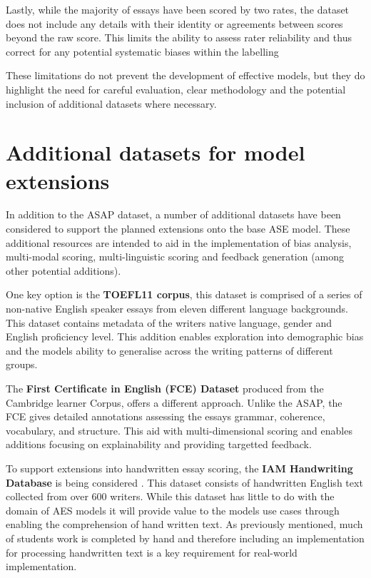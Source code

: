 \documentclass[12pt,a4paper]{report}
\begin{document}
Lastly, while the majority of essays have been scored by two rates, the dataset does not include any details with their identity or agreements between scores beyond the raw score. This limits the ability to assess rater reliability and thus correct for any potential systematic biases within the labelling

These limitations do not prevent the development of effective models, but they do highlight the need for careful evaluation, clear methodology and the potential inclusion of additional datasets where necessary.

\section{Additional datasets for model extensions}
In addition to the ASAP dataset, a number of additional datasets have been considered to support the planned extensions onto the base ASE model. These additional resources are intended to aid in the implementation of bias analysis, multi-modal scoring, multi-linguistic scoring and feedback generation (among other potential additions).

One key option is the \textbf{TOEFL11 corpus}, this dataset is comprised of a series of non-native English speaker essays from eleven different language backgrounds. This dataset contains metadata of the writers native language, gender and English proficiency level. This addition enables exploration into demographic bias and the models ability to generalise across the writing patterns of different groups\citep{blanchard2013toefl}.

The \textbf{First Certificate in English (FCE) Dataset} produced from the Cambridge learner Corpus, offers a different approach. Unlike the ASAP, the FCE gives detailed annotations assessing the essays grammar, coherence, vocabulary, and structure. This aid with multi-dimensional scoring and enables additions focusing on explainability and providing targetted feedback.

To support extensions into handwritten essay scoring, the \textbf{IAM Handwriting Database} is being considered \citep{marti2002iam}. This dataset consists of handwritten English text collected from over 600 writers. While this dataset has little to do with the domain of AES models it will provide value to the models use cases through enabling the comprehension of hand written text. As previously mentioned, much of students work is completed by hand and therefore including an implementation for processing handwritten text is a key requirement for real-world implementation.
\end{document}
